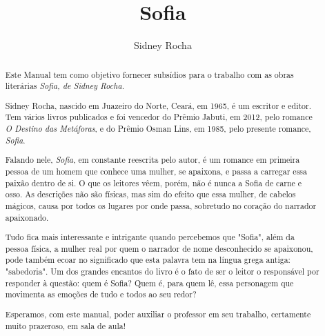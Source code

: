 \documentclass{extarticle}
\begin{document}
\newcommand{\AutorLivro}{Sidney Rocha}
\newcommand{\TituloLivro}{Sofia}
\newcommand{\Tema}{Ficção, mistério e fantasia}
\newcommand{\Genero}{Romance}
\newcommand{\imagemCapa}{./images/PNLD0054-01.png}
\newcommand{\issnppub}{---}
\newcommand{\issnepub}{---}
\newcommand{\colaborador}{\textbf{Fulano de Tal} é uma pessoa incrível e vai fazer um bom serviço.}


\title{\TituloLivro}
\author{\AutorLivro}
\def\authornotes{\colaborador}

\date{}
\maketitle

\begin{abstract}
\lipsum[1-3]
\end{abstract}

\tableofcontents


\begin{abstract}

Este Manual tem como objetivo fornecer subsídios para o trabalho com as
obras literárias \emph{Sofia, de Sidney Rocha.}

Sidney Rocha, nascido em Juazeiro do Norte, Ceará, em 1965, é um escritor 
e editor. Tem vários livros publicados e foi vencedor do Prêmio Jabuti, 
em 2012, pelo romance \textit{O Destino das Metáforas}, e do Prêmio Osman
Lins, em 1985, pelo presente romance, \textit{Sofia}.

Falando nele, \textit{Sofia}, em constante reescrita pelo autor, é um romance
em primeira pessoa de um homem que conhece uma mulher, se apaixona, e passa 
a carregar essa paixão dentro de si. O que os leitores vêem, porém, não é nunca 
a Sofia de carne e osso. As descrições não são físicas, mas sim do efeito que 
essa mulher, de cabelos mágicos, causa por todos os lugares por onde passa, 
sobretudo no coração do narrador apaixonado. 

Tudo fica mais interessante e intrigante quando percebemos que "Sofia", além da 
pessoa física, a mulher real por quem o narrador de nome desconhecido se apaixonou, 
pode também ecoar no significado que esta palavra tem na língua grega antiga: 
"sabedoria". Um dos grandes encantos do livro é o fato de ser o leitor o 
responsável por responder à questão: quem é Sofia? Quem é, para quem lê, essa 
personagem que movimenta as emoções de tudo e todos ao seu redor?

Esperamos, com este manual, poder auxiliar o professor em seu trabalho, certamente
muito prazeroso, em sala de aula!


\end{abstract}
\end{document}
